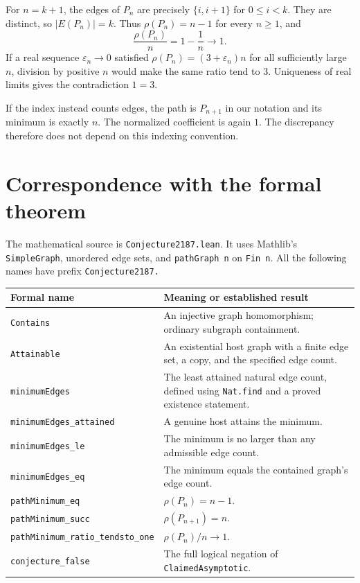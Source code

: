 \documentclass[10pt]{article}
\newcommand{\code}[1]{\texttt{\small #1}}
\begin{document}
For $n=k+1$, the edges of $P_n$ are precisely
$\{i,i+1\}$ for $0\leq i<k$. They are distinct, so $|E(P_n)|=k$.
Thus $\rho(P_n)=n-1$ for every $n\geq1$, and
\[
 \frac{\rho(P_n)}{n}=1-\frac1n\longrightarrow1.
\]
If a real sequence $\varepsilon_n\to0$ satisfied
$\rho(P_n)=(3+\varepsilon_n)n$ for all sufficiently large $n$, division
by positive $n$ would make the same ratio tend to $3$.
Uniqueness of real limits gives the contradiction $1=3$.

If the index instead counts edges, the path is $P_{n+1}$ in our notation
and its minimum is exactly $n$. The normalized coefficient is again $1$.
The discrepancy therefore does not depend on this indexing convention.

\newpage
\section{Correspondence with the formal theorem}
The mathematical source is \code{Conjecture2187.lean}. It uses Mathlib's
\code{SimpleGraph}, unordered edge sets, and \code{pathGraph n} on
\code{Fin n}. All the following names have prefix \code{Conjecture2187.}

\begingroup
\small
\renewcommand{\arraystretch}{1.10}
\begin{tabular}{@{}p{}p{}@{}}
\toprule
\normalfont Formal name & Meaning or established result\\
\midrule
\code{Contains} & An injective graph homomorphism; ordinary subgraph containment.\\
\code{Attainable} & An existential host graph with a finite edge set, a copy, and the specified edge count.\\
\code{minimumEdges} & The least attained natural edge count, defined using \code{Nat.find} and a proved existence statement.\\
\code{minimumEdges\_attained} & A genuine host attains the minimum.\\
\code{minimumEdges\_le} & The minimum is no larger than any admissible edge count.\\
\code{minimumEdges\_eq} & The minimum equals the contained graph's edge count.\\
\code{pathMinimum\_eq} & $\rho(P_n)=n-1$.\\
\code{pathMinimum\_succ} & $\rho(P_{n+1})=n$.\\
\code{pathMinimum\_ratio\_tendsto\_one} & $\rho(P_n)/n\to1$.\\
\code{conjecture\_false} & The full logical negation of \code{ClaimedAsymptotic}.\\
\bottomrule
\end{tabular}
\endgroup
\end{document}
